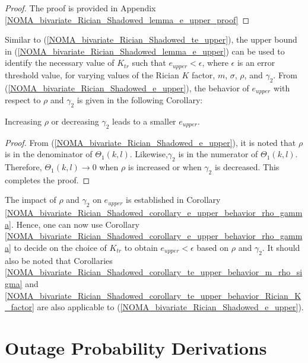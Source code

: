 \begin{proof}
The proof is provided in Appendix \ref{NOMA_bivariate_Rician_Shadowed_lemma_e_upper_proof}
\end{proof}

Similar to (\ref{NOMA_bivariate_Rician_Shadowed_te_upper}), the upper bound in (\ref{NOMA_bivariate_Rician_Shadowed_lemma_e_upper}) can be used to identify the necessary value of $K_{tr}$ such that $e_{upper} < \epsilon$, where $\epsilon$ is an error threshold value, for varying values of the Rician $K$ factor, $m$, $\sigma$, $\rho$, and $\gamma_2$. From (\ref{NOMA_bivariate_Rician_Shadowed_e_upper}), the behavior of $e_{upper}$ with respect to $\rho$ and $\gamma_2$ is given in the following Corollary:
\begin{corollary} \label{NOMA_bivariate_Rician_Shadowed_corollary_e_upper_behavior_rho_gamma}
Increasing $\rho$ or decreasing $\gamma_2$ leads to a smaller $e_{upper}$.
\end{corollary}
\begin{proof}
From (\ref{NOMA_bivariate_Rician_Shadowed_e_upper}), it is noted that $\rho$ is in the denominator of $\Theta_1(k,l)$. Likewise,$\gamma_2$ is in the numerator of $\Theta_1(k,l)$. Therefore, $\Theta_1(k,l) \to 0$ when $\rho$ is increased or when $\gamma_2$ is decreased. This completes the proof.
\end{proof}

The impact of $\rho$ and $\gamma_2$ on $e_{upper}$ is established in Corollary \ref{NOMA_bivariate_Rician_Shadowed_corollary_e_upper_behavior_rho_gamma}. Hence, one can now use Corollary \ref{NOMA_bivariate_Rician_Shadowed_corollary_e_upper_behavior_rho_gamma} to decide on the choice of $K_{tr}$ to obtain $e_{upper} < \epsilon$ based on $\rho$ and $\gamma_2$. It should also be noted that Corollaries \ref{NOMA_bivariate_Rician_Shadowed_corollary_te_upper_behavior_m_rho_sigma} and \ref{NOMA_bivariate_Rician_Shadowed_corollary_te_upper_behavior_Rician_K_factor} are also applicable to (\ref{NOMA_bivariate_Rician_Shadowed_e_upper}). 


\section{Outage Probability Derivations} \label{NOMA_bivariate_Rician_Shadowed_sec_outage}

